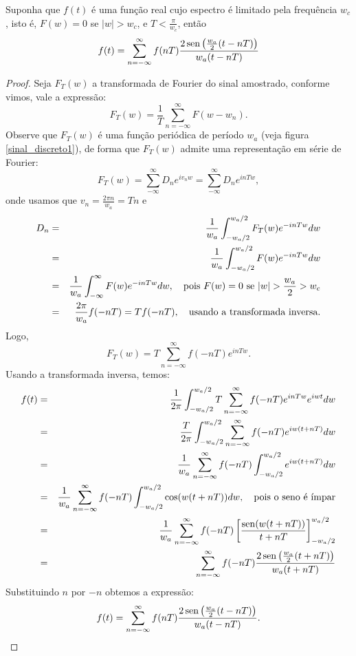 \begin{teo} Suponha que $f(t)$ é uma função real cujo espectro é limitado pela frequência $w_c$, isto é, $F(w)=0$ se $|w|>w_c$, e $T<\frac{\pi}{w_c}$, então
$$
f(t)=\sum_{n=-\infty}^\infty f(nT) \frac{2\operatorname{sen}\left(\frac{w_a}{2}(t-nT)\right)}{w_a(t-nT)}
$$
\end{teo}
\begin{proof} Seja $F_T(w)$ a transformada de Fourier do sinal amostrado, conforme vimos, vale a expressão:
$$
F_T(w)=\frac{1}{T}\sum_{n=-\infty}^\infty F(w-w_n).
$$
Observe que $F_T(w)$ é uma função periódica de período $w_a$ (veja figura \ref{sinal_discreto1}), de forma que $F_T(w)$ admite uma representação em série de Fourier:
$$
F_T(w)=\sum_{-\infty}^\infty D_n e^{iv_n w}=\sum_{-\infty}^\infty D_n e^{in Tw},
$$
onde usamos que $v_n=\frac{2\pi n}{w_a}=Tn$ e 
\begin{eqnarray*}
D_n&=&\frac{1}{w_a}\int_{-w_a/2}^{w_a/2}F_T(w)e^{-in Tw}dw\\
&=&\frac{1}{w_a}\int_{-w_a/2}^{w_a/2}F(w)e^{-in Tw}dw\\
&=&\frac{1}{w_a}\int_{-\infty}^{\infty}F(w)e^{-in T w}dw,\quad \hbox{pois}\ F(w)=0\ \hbox{se}\ |w|>\frac{w_a}{2}>w_c\\
&=&\frac{2\pi}{w_a}f(-nT)=Tf(-nT),\quad \hbox{usando a transformada inversa}.
\end{eqnarray*}
Logo,
$$
F_T(w)=T\sum_{n=-\infty}^\infty f(-nT) e^{in Tw}.
$$
Usando a transformada inversa, temos:
\begin{eqnarray*}
f(t)&=&\frac{1}{2\pi}\int_{-w_a/2}^{w_a/2}T\sum_{n=-\infty}^\infty f(-nT) e^{in Tw} e^{i w t}dw\\
&=&\frac{T}{2\pi}\int_{-w_a/2}^{w_a/2}\sum_{n=-\infty}^\infty f(-nT) e^{iw(t+nT)} dw\\
&=&\frac{1}{w_a}\sum_{n=-\infty}^\infty f(-nT)\int_{-w_a/2}^{w_a/2}  e^{iw(t+nT)} dw\\
&=&\frac{1}{w_a}\sum_{n=-\infty}^\infty f(-nT)\int_{-w_a/2}^{w_a/2}  \cos(w(t+nT)) dw,\quad \hbox{pois o seno é ímpar}\\
&=&\frac{1}{w_a}\sum_{n=-\infty}^\infty f(-nT)\left[  \frac{\operatorname{sen}(w(t+nT))}{t+nT} \right]_{-w_a/2}^{w_a/2}\\
&=&\sum_{n=-\infty}^\infty f(-nT) \frac{2\operatorname{sen}\left(\frac{w_a}{2}(t+nT)\right)}{w_a(t+nT)} 
\end{eqnarray*}
Substituindo $n$ por $-n$ obtemos a expressão:
$$
f(t)=\sum_{n=-\infty}^\infty f(nT) \frac{2\operatorname{sen}\left(\frac{w_a}{2}(t-nT)\right)}{w_a(t-nT)}.
$$

\end{proof}

